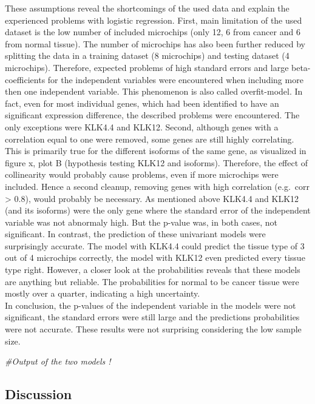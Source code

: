 \documentclass[
]{article}
\newenvironment{Shaded}{\begin{snugshade}}{\end{snugshade}}
\newcommand{\CommentTok}[1]{\textcolor[rgb]{0.56,0.35,0.01}{\textit{#1}}}
\begin{document}
These assumptions reveal the shortcomings of the used data and explain
the experienced problems with logistic regression. First, main
limitation of the used dataset is the low number of included microchips
(only 12, 6 from cancer and 6 from normal tissue). The number of
microchips has also been further reduced by splitting the data in a
training dataset (8 microchips) and testing dataset (4 microchips).
Therefore, expected problems of high standard errors and large
beta-coefficients for the independent variables were encountered when
including more then one independent variable. This phenomenon is also
called overfit-model. In fact, even for most individual genes, which had
been identified to have an significant expression difference, the
described problems were encountered. The only exceptions were KLK4.4 and
KLK12. Second, although genes with a correlation equal to one were
removed, some genes are still highly correlating. This is primarily true
for the different isoforms of the same gene, as visualized in figure x,
plot B (hypothesis testing KLK12 and isoforms). Therefore, the effect of
collinearity would probably cause problems, even if more microchips were
included. Hence a second cleanup, removing genes with high correlation
(e.g.~corr \textgreater{} 0.8), would probably be necessary. As
mentioned above KLK4.4 and KLK12 (and its isoforms) were the only gene
where the standard error of the independent variable was not abnormaly
high. But the p-value was, in both cases, not significant. In contrast,
the prediction of these univariant models were surprisingly accurate.
The model with KLK4.4 could predict the tissue type of 3 out of 4
microchips correctly, the model with KLK12 even predicted every tissue
type right. However, a closer look at the probabilities reveals that
these models are anything but reliable. The probabilities for normal to
be cancer tissue were mostly over a quarter, indicating a high
uncertainty.\\
In conclusion, the p-values of the independent variable in the models
were not significant, the standard errors were still large and the
predictions probabilities were not accurate. These results were not
surprising considering the low sample size.

\begin{Shaded}
\begin{Highlighting}[]
\CommentTok{\#Output of the two models !}
\end{Highlighting}
\end{Shaded}

\hypertarget{discussion}{%
\subsection{Discussion}\label{discussion}}
\end{document}
